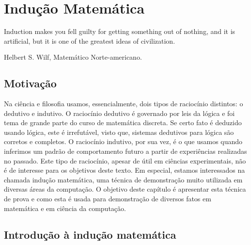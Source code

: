 \chapter{Indução Matemática}\label{cap9}

\epigraph{Induction makes you fell guilty for getting something out of
nothing, and it is artificial, but it is one of the greatest ideas of
civilization.}{Helbert S. Wilf, Matemático Norte-americano.}

\section{Motivação}

Na ciência e filosofia usamos, essencialmente, dois tipos de
raciocínio distintos: o dedutivo e indutivo. O raciocínio dedutivo é
governado por leis da lógica e foi tema de grande parte do curso de
matemática discreta. Se certo fato é deduzido usando lógica, este é
irrefutável, visto que, sistemas dedutivos para lógica são corretos e
completos. O raciocínio indutivo, por sua vez, é o que usamos quando
inferimos um padrão de comportamento futuro a partir de experiências
realizadas no passado. Este tipo de raciocínio, apesar de útil em
ciências experimentais, não é de interesse para os objetivos deste
texto. Em especial, estamos interessados na chamada indução
matemática, uma técnica de demonstração muito utilizada em diversas
áreas da computação.
O objetivo
deste capítulo é apresentar esta técnica de prova e como esta é usada
para demonstração de diversos fatos em matemática e em ciência da
computação.


\section{Introdução à indução matemática}

